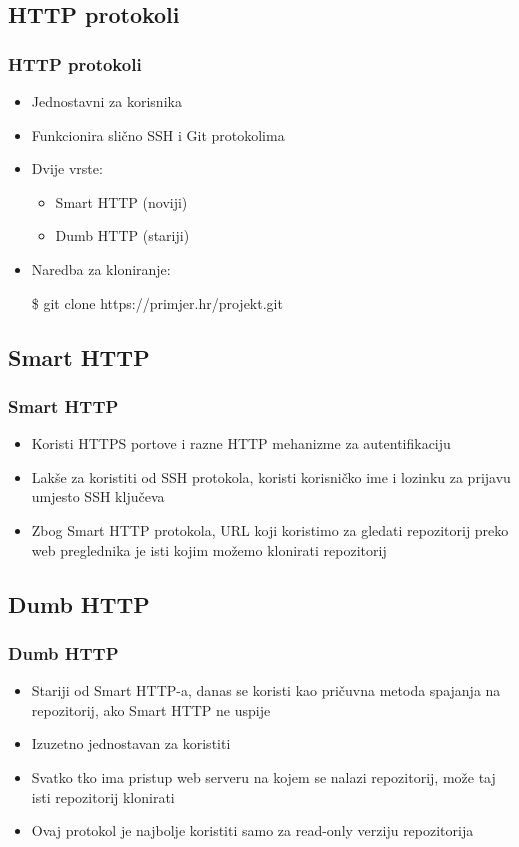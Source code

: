 \subsection{HTTP protokoli}

\begin{frame}
\frametitle{HTTP protokoli}
\begin{itemize}
	\item Jednostavni za korisnika
	\item Funkcionira slično SSH i Git protokolima
	\item Dvije vrste:
	\begin{itemize}
		\item Smart HTTP (noviji)
		\item Dumb HTTP (stariji)
	\end{itemize}
	\item Naredba za kloniranje:

	\$ git clone https://primjer.hr/projekt.git
\end{itemize}
\end{frame}


\subsection{Smart HTTP}
\begin{frame}
\frametitle{Smart HTTP}
\begin{itemize}
	\item Koristi HTTPS portove i razne HTTP mehanizme za autentifikaciju
	\item Lakše za koristiti od SSH protokola, koristi korisničko ime i lozinku za prijavu umjesto SSH ključeva
	\item Zbog Smart HTTP protokola, URL koji koristimo za gledati repozitorij preko web preglednika je isti kojim možemo klonirati repozitorij
\end{itemize}
\end{frame}


\subsection{Dumb HTTP}
\begin{frame}
\frametitle{Dumb HTTP}
\begin{itemize}
	\item Stariji od Smart HTTP-a, danas se koristi kao pričuvna metoda spajanja na repozitorij, ako Smart HTTP ne uspije
	\item Izuzetno jednostavan za koristiti
	\item Svatko tko ima pristup web serveru na kojem se nalazi repozitorij, može taj isti repozitorij klonirati
	\item Ovaj protokol je najbolje koristiti samo za read-only verziju repozitorija
\end{itemize}
\end{frame}